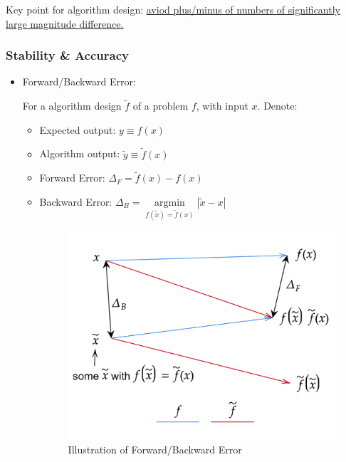     Key point for algorithm design: \uline{aviod plus/minus of numbers of significantly large magnitude difference.}
    
\subsubsection{Stability \& Accuracy} 

\begin{itemize}[topsep=2pt,itemsep=0pt]
    \item Forward/Backward Error:
    
    For a algorithm design $ \tilde{f} $ of a problem $ f $, with input $ x $. Denote:
\begin{itemize}[topsep=2pt,itemsep=0pt]
    \item Expected output: $ y\equiv f(x) $
    \item Algorithm output: $ \tilde{y}\equiv \tilde{f}(x) $
    \item Forward Error: $ \Delta _F=\tilde{f}(x)-f(x) $
    \item Backward Error: $ \Delta _B=\mathop{\arg\min}\limits_{f(\tilde{x})=\tilde{f}(x)} |\tilde{x}-x|  $
\begin{figure}[H]
    \centering
    \includegraphics[width=0.45\linewidth]{sections/images/ForwardError.png}
    \caption{Illustration of Forward/Backward Error}
\end{figure}


\end{itemize}
\end{itemize}
